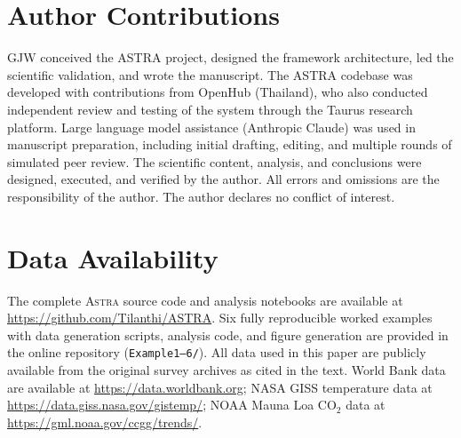 \documentclass[usenatbib]{rasti}
\newcommand{\astra}{\textsc{Astra}\xspace}
\begin{document}
\section*{Author Contributions}

GJW conceived the ASTRA project, designed the framework architecture, led the scientific validation, and wrote the manuscript.
The ASTRA codebase was developed with contributions from OpenHub (Thailand), who also conducted independent review and testing of the system through the Taurus research platform.
Large language model assistance (Anthropic Claude) was used in manuscript preparation, including initial drafting, editing, and multiple rounds of simulated peer review.
The scientific content, analysis, and conclusions were designed, executed, and verified by the author.
All errors and omissions are the responsibility of the author.
The author declares no conflict of interest.

\section*{Data Availability}

The complete \astra source code and analysis notebooks are available at \url{https://github.com/Tilanthi/ASTRA}.
Six fully reproducible worked examples with data generation scripts, analysis code, and figure generation are provided in the online repository (\texttt{Example1--6/}).
All data used in this paper are publicly available from the original survey archives as cited in the text.
World Bank data are available at \url{https://data.worldbank.org}; NASA GISS temperature data at \url{https://data.giss.nasa.gov/gistemp/}; NOAA Mauna Loa CO$_{2}$ data at \url{https://gml.noaa.gov/ccgg/trends/}.



\end{document}
